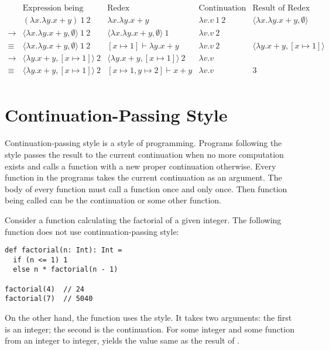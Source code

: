\[
\begin{array}{ccccc}
&\text{Expression being Evaluated} & \text{Redex} & \text{Continuation} &
\text{Result of Redex} \\
& (\lambda x.\lambda y.x+y)\ 1\ 2 & \lambda x.\lambda y.x+y & \lambda v.v\ 1\ 2 &
\langle\lambda x.\lambda y.x+y,             \emptyset\rangle \\
\rightarrow&\langle\lambda x.\lambda y.x+y,\emptyset\rangle\ 1\ 2 &
\langle\lambda x.\lambda y.x+y,\emptyset\rangle\ 1 & \lambda v.v\ 2 &  \\
\equiv&\langle\lambda x.\lambda y.x+y,\emptyset\rangle\ 1\ 2 &
[x\mapsto 1]\vdash\lambda y.x+y & \lambda v.v\ 2 &
\langle\lambda y.x+y,[x\mapsto 1]\rangle \\
\rightarrow& \langle\lambda y.x+y,[x\mapsto 1]\rangle\ 2 &
\langle\lambda y.x+y,[x\mapsto 1]\rangle\ 2 & \lambda v.v & \\
\equiv& \langle\lambda y.x+y,[x\mapsto 1]\rangle\ 2 &
[x\mapsto 1,y\mapsto 2]\vdash x+y & \lambda v.v & 3 \\
\end{array}
\]

\section{Continuation-Passing Style}

Continuation-passing style is a style of programming. Programs following the
style passes the result to the current continuation when no more computation
exists and calls a function with a new proper continuation otherwise. Every
function in the programs takes the current continuation as an argument. The body
of every function must call a function once and only once. Then function being
called can be the continuation or some other function.

Consider a function calculating the factorial of a given integer. The following
function does not use continuation-passing style:

\begin{verbatim}
def factorial(n: Int): Int =
  if (n <= 1) 1
  else n * factorial(n - 1)

factorial(4)  // 24
factorial(7)  // 5040
\end{verbatim}

On the other hand, the  function uses the style. It takes two
arguments: the first is an integer; the second is the continuation. For some
integer  and some function  from an integer to integer,
 yields the value same as the result of
.

